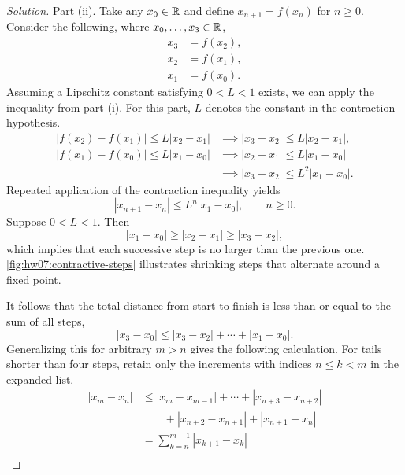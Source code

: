 \begin{proof}[Solution]
  Part (ii).
  Take any $x_0\in\mathbb{R}$ and define
  $x_{n+1}=f(x_n)$ for $n\ge0$.
  Consider the following, where $x_0,\ldots,x_3\in\mathbb{R}$,
  \[
    \begin{aligned}
      x_3&=f(x_2),\\
      x_2&=f(x_1),\\
      x_1&=f(x_0).
    \end{aligned}
  \]
  Assuming a Lipschitz constant satisfying $0<L<1$ exists, we can
  apply the inequality from part (i).
  For this part, $L$ denotes the constant in the
  contraction hypothesis.
  \[
    \begin{aligned}
      |f(x_2)-f(x_1)|\le L|x_2-x_1|
        &\implies |x_3-x_2|\le L|x_2-x_1|,\\
      |f(x_1)-f(x_0)|\le L|x_1-x_0|
        &\implies |x_2-x_1|\le L|x_1-x_0|\\
        &\implies |x_3-x_2|\le L^2|x_1-x_0|.
    \end{aligned}
  \]
  Repeated application of the contraction inequality yields
  \[
    |x_{n+1}-x_n|\le L^n|x_1-x_0|,
    \qquad n\ge0.
  \]
  Suppose $0<L<1$. Then
  \[
    |x_1-x_0|\ge |x_2-x_1|\ge |x_3-x_2|,
  \]
  which implies that each successive step is
  no larger than the previous one.
  \autoref{fig:hw07:contractive-steps} illustrates
  shrinking steps that alternate around a fixed point.
  \begin{marginfigure}
    \centering
    
    \caption[Shrinking steps in a contraction iteration.]{%
      For $f(t)=1-t/2$ and $x_0=0$, the filled
      points are $x_0,x_1,x_2,x_3$. The open point is the fixed point
      $x^*=2/3$. From top to bottom, the arrows show successive steps
      of lengths $1$, $1/2$, and $1/4$, with alternating directions.}
    \label{fig:hw07:contractive-steps}
  \end{marginfigure}
  It follows that the total distance from start to finish is less
  than or equal to the sum of all steps,
  \[
    |x_3-x_0|\le |x_3-x_2|+\cdots+|x_1-x_0|.
  \]
  Generalizing this for arbitrary $m>n$ gives
  the following calculation. For tails shorter than four steps, retain
  only the increments with indices $n\le k<m$ in the expanded list.
  \[
    \begin{aligned}
      |x_m-x_n|
        &\le |x_m-x_{m-1}|+\cdots+|x_{n+3}-x_{n+2}|\\
        &\qquad+|x_{n+2}-x_{n+1}|+|x_{n+1}-x_n|\\
        &=\sum_{k=n}^{m-1}|x_{k+1}-x_k|\\

\end{aligned}\]
\end{proof}
